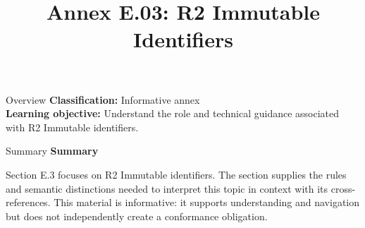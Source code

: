 \documentclass[10pt,letterpaper]{article}
\title{Annex E.03: R2 Immutable Identifiers}
\author{}
\date{}
\begin{document}
\maketitle
\begin{CornellOverviewBox}{Overview}
\textbf{Classification:} Informative annex\\[2pt]
\textbf{Learning objective:} Understand the role and technical guidance associated with R2 Immutable identifiers.
\end{CornellOverviewBox}\begin{CornellSummaryBox}{Summary}
{\sffamily\bfseries\color{Accent} Summary}\par\vspace{3pt}Section E.3 focuses on R2 Immutable identifiers. The section supplies the rules and semantic distinctions needed to interpret this topic in context with its cross-references. This material is informative: it supports understanding and navigation but does not independently create a conformance obligation.
\end{CornellSummaryBox}
\end{document}
